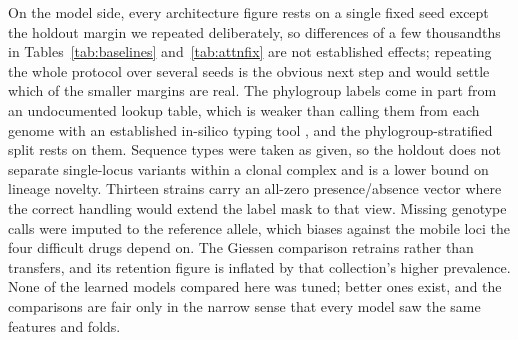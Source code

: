 On the model side, every architecture figure rests on a single fixed seed except the holdout margin
we repeated deliberately, so differences of a few thousandths in Tables~\ref{tab:baselines}
and~\ref{tab:attnfix} are not established effects; repeating the whole protocol over several seeds
is the obvious next step and would settle which of the smaller margins are real. The phylogroup
labels come in part from an undocumented lookup table, which is weaker than calling them from each
genome with an established in-silico typing tool \cite{beghain2018clermontyping}, and the
phylogroup-stratified split rests on them. Sequence types were taken as given, so the holdout does
not separate single-locus variants within a clonal complex and is a lower bound on lineage novelty.
Thirteen strains carry an all-zero presence/absence vector where the correct handling would extend
the label mask to that view. Missing genotype calls were imputed to the reference allele, which
biases against the mobile loci the four difficult drugs depend on. The Giessen comparison retrains
rather than transfers, and its retention figure is inflated by that collection's higher prevalence.
None of the learned models compared here was tuned; better ones exist, and the comparisons are fair
only in the narrow sense that every model saw the same features and folds.
